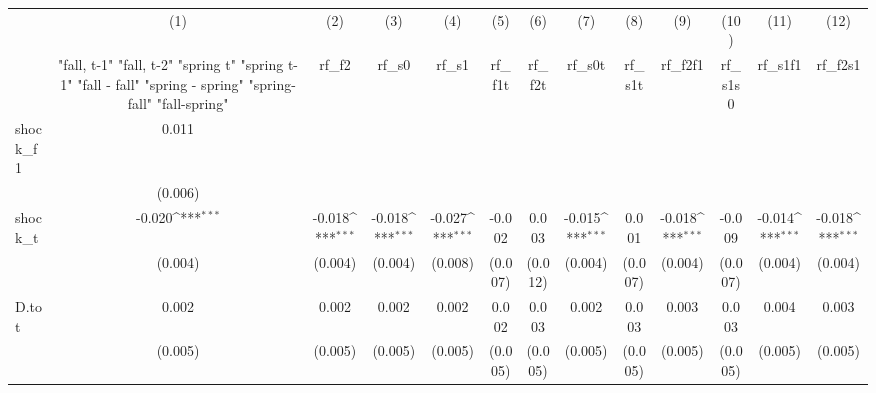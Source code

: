 {
\def\sym#1{\ifmmode^{#1}\else\(^{#1}\)\fi}
\begin{tabular}{l*{12}{c}}
\toprule
            &\multicolumn{1}{c}{(1)}&\multicolumn{1}{c}{(2)}&\multicolumn{1}{c}{(3)}&\multicolumn{1}{c}{(4)}&\multicolumn{1}{c}{(5)}&\multicolumn{1}{c}{(6)}&\multicolumn{1}{c}{(7)}&\multicolumn{1}{c}{(8)}&\multicolumn{1}{c}{(9)}&\multicolumn{1}{c}{(10)}&\multicolumn{1}{c}{(11)}&\multicolumn{1}{c}{(12)}\\
            &\multicolumn{1}{c}{  "fall, t-1" "fall, t-2" "spring t" "spring t-1"  "fall - fall" "spring - spring" "spring-fall" "fall-spring" }&\multicolumn{1}{c}{rf\_f2}&\multicolumn{1}{c}{rf\_s0}&\multicolumn{1}{c}{rf\_s1}&\multicolumn{1}{c}{rf\_f1t}&\multicolumn{1}{c}{rf\_f2t}&\multicolumn{1}{c}{rf\_s0t}&\multicolumn{1}{c}{rf\_s1t}&\multicolumn{1}{c}{rf\_f2f1}&\multicolumn{1}{c}{rf\_s1s0}&\multicolumn{1}{c}{rf\_s1f1}&\multicolumn{1}{c}{rf\_f2s1}\\
\midrule
shock\_f1    &       0.011         &                     &                     &                     &                     &                     &                     &                     &                     &                     &                     &                     \\
            &     (0.006)         &                     &                     &                     &                     &                     &                     &                     &                     &                     &                     &                     \\
\addlinespace
shock\_t     &      -0.020\sym{***}&      -0.018\sym{***}&      -0.018\sym{***}&      -0.027\sym{***}&      -0.002         &       0.003         &      -0.015\sym{***}&       0.001         &      -0.018\sym{***}&      -0.009         &      -0.014\sym{***}&      -0.018\sym{***}\\
            &     (0.004)         &     (0.004)         &     (0.004)         &     (0.008)         &     (0.007)         &     (0.012)         &     (0.004)         &     (0.007)         &     (0.004)         &     (0.007)         &     (0.004)         &     (0.004)         \\
\addlinespace
D.tot       &       0.002         &       0.002         &       0.002         &       0.002         &       0.002         &       0.003         &       0.002         &       0.003         &       0.003         &       0.003         &       0.004         &       0.003         \\
            &     (0.005)         &     (0.005)         &     (0.005)         &     (0.005)         &     (0.005)         &     (0.005)         &     (0.005)         &     (0.005)         &     (0.005)         &     (0.005)         &     (0.005)         &     (0.005)         \\

\end{tabular}}
